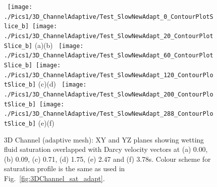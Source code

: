   \begin{figure}[ht] 
    \vbox{\vspace{0.cm}
        \hbox{\hspace{-3.cm}
            \texttt{[image: ./Pics1/3D\_ChannelAdaptive/Test\_SlowNewAdapt\_0\_ContourPlotSlice\_b]} \hspace{-.5cm}
            \texttt{[image: ./Pics1/3D\_ChannelAdaptive/Test\_SlowNewAdapt\_20\_ContourPlotSlice\_b]}}
        \hbox{\hspace{2cm}(a)\hspace{9cm}(b)}
        \hbox{\hspace{-3.cm}
            \texttt{[image: ./Pics1/3D\_ChannelAdaptive/Test\_SlowNewAdapt\_60\_ContourPlotSlice\_b]}
            \texttt{[image: ./Pics1/3D\_ChannelAdaptive/Test\_SlowNewAdapt\_120\_ContourPlotSlice\_b]}}
        \hbox{\hspace{2cm}(c)\hspace{9cm}(d)}
        \hbox{\hspace{-3.cm}
            \texttt{[image: ./Pics1/3D\_ChannelAdaptive/Test\_SlowNewAdapt\_200\_ContourPlotSlice\_b]}
            \texttt{[image: ./Pics1/3D\_ChannelAdaptive/Test\_SlowNewAdapt\_288\_ContourPlotSlice\_b]}}
        \hbox{\hspace{2cm}(e)\hspace{9cm}(f)}
}
    \caption{3D Channel (adaptive mesh):  XY and YZ planes showing wetting fluid saturation overlapped with Darcy velocity vectors at  (a) 0.00, (b) 0.09, (c) 0.71, (d) 1.75, (e) 2.47 and (f) 3.78s. Colour scheme for saturation profile is the same as used in Fig.~\ref{fig:3DChannel_sat_adapt}.}
\label{fig:3DChannel_satvel_XYplanes_adapt}
\end{figure}
  \clearpage


